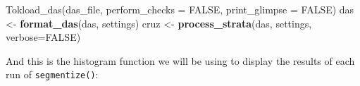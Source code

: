\documentclass[
]{book}
\newenvironment{Shaded}{\begin{snugshade}}{\end{snugshade}}
\newcommand{\DataTypeTok}[1]{\textcolor[rgb]{0.13,0.29,0.53}{#1}}
\newcommand{\KeywordTok}[1]{\textcolor[rgb]{0.13,0.29,0.53}{\textbf{#1}}}
\newcommand{\NormalTok}[1]{#1}
\newcommand{\OtherTok}[1]{\textcolor[rgb]{0.56,0.35,0.01}{#1}}
\newcommand{\StringTok}[1]{\textcolor[rgb]{0.31,0.60,0.02}{#1}}
\begin{document}
\begin{Shaded}
\begin{Highlighting}[]
Tok{load_das}\NormalTok{(das_file, }
                \DataTypeTok{perform_checks =} \OtherTok{FALSE}\NormalTok{,}
                \DataTypeTok{print_glimpse =} \OtherTok{FALSE}\NormalTok{)}
\NormalTok{das <-}\StringTok{ }\KeywordTok{format_das}\NormalTok{(das, settings)}
\NormalTok{cruz <-}\StringTok{ }\KeywordTok{process_strata}\NormalTok{(das,}
\NormalTok{                       settings,}
                       \DataTypeTok{verbose=}\OtherTok{FALSE}\NormalTok{)}
\end{Highlighting}
\end{Shaded}

And this is the histogram function we will be using to display the results of each run of \texttt{segmentize()}:
\end{document}

